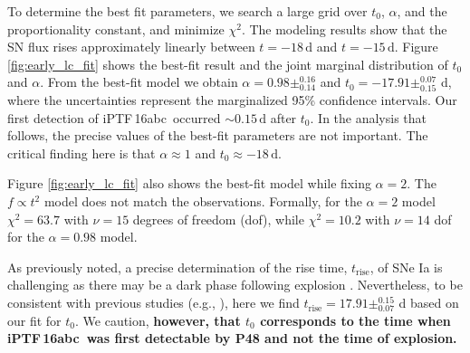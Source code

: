 \documentclass[twocolumn]{aastex61}
\newcommand{\abc}{iPTF\,16abc}
\begin{document}
To determine the best fit parameters, we search a large grid over $t_0$,
$\alpha$, and the proportionality constant, and minimize $\chi^2$. The
modeling results show that the SN flux rises approximately linearly between
$t=-18\,\mathrm{d}$ and $t=-15\,\mathrm{d}$. Figure \ref{fig:early_lc_fit}
shows the best-fit result and the joint marginal distribution of $t_0$ and
$\alpha$. From the best-fit model we obtain $\alpha=0.98 \pm ^{0.16}_{0.14}$
and $t_0=-17.91 \pm ^{0.07}_{0.15}$ d, where the uncertainties represent the
marginalized 95\% confidence intervals. Our first detection of \abc\ occurred
$\sim$${0.15}\,\textrm{d}$ after $t_0$. In the analysis that
follows, the precise values of the best-fit parameters are not important. The
critical finding here is that $\alpha \approx 1$ and $t_0 \approx -18 \,
\mathrm{d}$.

Figure \ref{fig:early_lc_fit} also shows the best-fit model while fixing
$\alpha = 2$. The $f \propto t^2$ model does not match the observations.
Formally, for the $\alpha = 2$ model $\chi^2 = 63.7$ with $\nu = 15$ degrees
of freedom (dof), while $\chi^2 = 10.2$ with $\nu = 14$ dof for the $\alpha =
0.98$ model.

As previously noted, a precise determination of the rise time,
$t_\mathrm{rise}$, of SNe Ia is challenging as there may be a dark phase
following explosion \citep{2014ApJ...784...85P}. Nevertheless, to be
consistent with previous studies (e.g., \citealt{2011MNRAS.416.2607G}), here
we find $t_\mathrm{rise} = 17.91\pm _{0.07}^{0.15}$ d based on our fit for
$t_0$. We caution, \textbf{however, that $t_0$ corresponds to the time when \abc\ was first detectable by P48 and not the time of explosion.}
\end{document}
